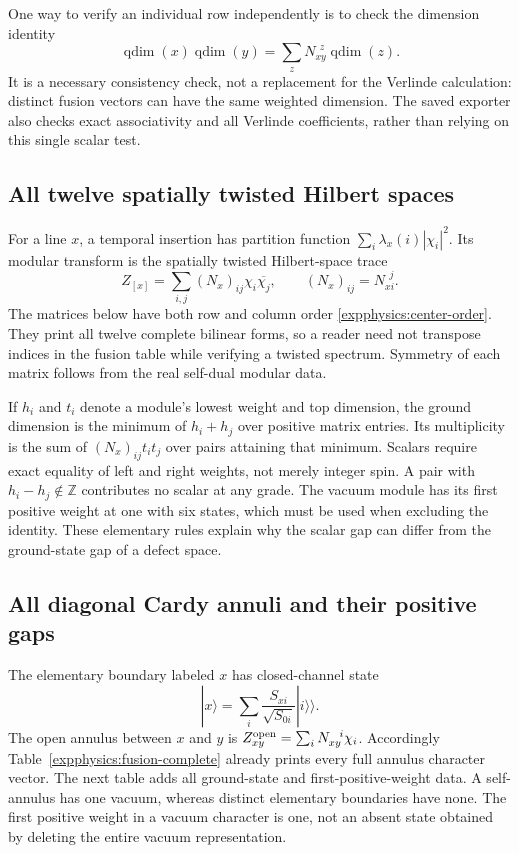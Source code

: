 

One way to verify an individual row independently is to check the
dimension identity
\[
 \operatorname{qdim}(x)\operatorname{qdim}(y)
 =\sum_zN_{xy}^{\ \ z}\operatorname{qdim}(z).
\]
It is a necessary consistency check, not a replacement for the
Verlinde calculation: distinct fusion vectors can have the same
weighted dimension. The saved exporter also checks exact
associativity and all Verlinde coefficients, rather than relying
on this single scalar test.

\subsection{All twelve spatially twisted Hilbert spaces}

For a line $x$, a temporal insertion has partition function
$\sum_i\lambda_x(i)|\chi_i|^2$. Its modular transform is the
spatially twisted Hilbert-space trace
\begin{equation}
 Z_{[x]}=\sum_{i,j}(N_x)_{ij}\chi_i\overline{\chi_j},
 \qquad(N_x)_{ij}=N_{xi}^{\ \ j}.
 \label{expphysics:twisted-matrix}
\end{equation}
The matrices below have both row and column order
\eqref{expphysics:center-order}. They print all twelve complete
bilinear forms, so a reader need not transpose indices in the
fusion table while verifying a twisted spectrum. Symmetry of each
matrix follows from the real self-dual modular data.

If $h_i$ and $t_i$ denote a module's lowest weight and top dimension,
the ground dimension is the minimum of $h_i+h_j$ over positive
matrix entries. Its multiplicity is the sum of
$(N_x)_{ij}t_it_j$ over pairs attaining that minimum. Scalars
require exact equality of left and right weights, not merely
integer spin. A pair with $h_i-h_j\notin\mathbb Z$ contributes
no scalar at any grade. The vacuum module has its first positive
weight at one with six states, which must be used when excluding
the identity. These elementary rules explain why the scalar gap
can differ from the ground-state gap of a defect space.



\subsection{All diagonal Cardy annuli and their positive gaps}

The elementary boundary labeled $x$ has closed-channel state
\[
 |x\rangle=\sum_i\frac{S_{xi}}{\sqrt{S_{0i}}}|i\rangle\!\rangle.
\]
The open annulus between $x$ and $y$ is
$Z_{xy}^{\rm open}=\sum_iN_{xy}^{\ \ i}\chi_i$. Accordingly
Table~\ref{expphysics:fusion-complete} already prints every full
annulus character vector. The next table adds all ground-state
and first-positive-weight data. A self-annulus has one vacuum,
whereas distinct elementary boundaries have none. The first
positive weight in a vacuum character is one, not an absent
state obtained by deleting the entire vacuum representation.

